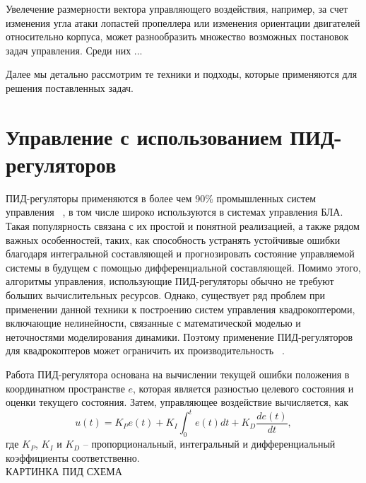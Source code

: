 \documentclass[a4paper,14pt,oneside,openany]{memoir}
\begin{document}
     Увелечение размерности вектора управляющего воздействия, например, за счет изменения угла атаки лопастей пропеллера или изменения ориентации двигателей относительно корпуса, может разнообразить множество возможных постановок задач управления. Среди них ...
     
	Далее мы детально рассмотрим те техники и подходы, которые применяются для решения поставленных задач. 
	
	\section{Управление с использованием ПИД-регуляторов}
	
	 ПИД-регуляторы применяются в более чем 90\% промышленных систем управления ~\cite{Astrom01}, в том числе широко используются в системах управления БЛА.  Такая популярность связана с их простой и понятной реализацией, а также рядом важных особенностей, таких, как способность устранять устойчивые ошибки благодаря интегральной составляющей и прогнозировать состояние управляемой системы в будущем с помощью дифференциальной составляющей. Помимо этого, алгоритмы управления, использующие ПИД-регуляторы обычно не требуют больших вычислительных ресурсов. Однако, существует ряд проблем при применении данной техники к построению систем управления квадрокоптероми, включающие нелинейности, связанные с математической моделью и неточностями моделирования динамики. Поэтому применение ПИД-регуляторов для квадрокоптеров может ограничить их производительность ~\cite{Zulu01}.
	
	Работа ПИД-регулятора основана на вычислении текущей ошибки положения в координатном пространстве $e$, которая является разностью целевого состояния и оценки текущего состояния. Затем, управляющее воздействие вычисляется, как
	\begin{equation} \label{eq:pid_common}
	u(t) = K_Pe(t) + K_I\int_0^t e(t) dt + K_D \frac{de(t)}{dt},
	\end{equation}
	где $K_P$, $K_I$ и $K_D$ -- пропорциональный, интегральный и дифференциальный коэффициенты соответственно.
	\\
	
	КАРТИНКА ПИД СХЕМА
	\\
	
\end{document}
